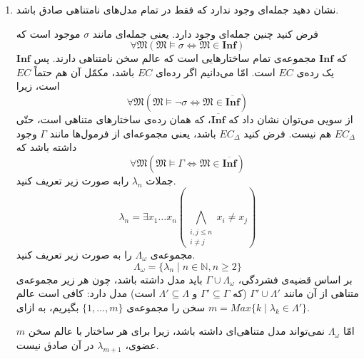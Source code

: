 \documentclass[12pt, 14paper]{article}
\begin{document}
\begin{enumerate}
\item نشان دهید جمله‌ای وجود ندارد که فقط در تمام مدل‌های نامتناهی صادق باشد.
\begin{ans}
  فرض کنید چنین جمله‌ای وجود دارد. یعنی جمله‌ای مانند $\sigma$ موجود است که
  $$ \forall \mathfrak{M} (\mathfrak{M} \vDash \sigma \iff \mathfrak{M} \in \mathbf{Inf}) $$
  که $\mathbf{Inf}$ مجموعه‌ی تمام ساختارهایی است که عالم سخن نامتناهی دارند. پس $\mathbf{Inf}$ یک رده‌ی $EC$ است. امّا می‌دانیم اگر رده‌ای $EC$ باشد، مکمّل آن هم حتماً $EC$ است، زیرا
  $$ \forall \mathfrak{M} (\mathfrak{M} \vDash \neg \sigma \iff \mathfrak{M} \in \overline{\mathbf{Inf}}) $$
  از سویی می‌توان نشان داد که $\overline{\mathbf{Inf}}$، که همان رده‌ی ساختارهای متناهی است، حتّی $EC_\Delta$ هم نیست. فرض کنید $EC_\Delta$ باشد، یعنی مجموعه‌ای از فرمول‌ها مانند $\Gamma$ وجود داشته باشد که
  $$ \forall \mathfrak{M} (\mathfrak{M} \vDash \Gamma \iff \mathfrak{M} \in \overline{\mathbf{Inf}}) $$
  جملات $\lambda_n$ رابه صورت زیر تعریف کنید.
  $$ \lambda_n = \exists x_1 \dots x_n (\bigwedge_{\substack{i,j \leq n \\ i \neq j}} x_i \neq x_j)  $$
  مجموعه‌ی $\Lambda_\omega$ را به صورت زیر تعریف کنید.
  $$ \Lambda_\omega = \{ \lambda_n \mid n \in \mathbb{N}, n \geq 2 \} $$
  بر اساس قضیه‌ی فشردگی، $\Gamma \cup \Lambda_\omega$ باید مدل داشته باشد، چون هر زیر مجموعه‌ی متناهی از آن مانند $\Gamma' \cup \Lambda'$ (که $\Gamma' \subseteq \Gamma$ و $\Lambda' \subseteq \Lambda$ است) مدل دارد: کافی است عالم سخن را مجموعه‌ی $\{ 1, \dots, m \}$ بگیریم، به ازای $m = Max\{k \mid \lambda_k \in \Lambda'\}$.

  امّا $\Lambda_\omega$ نمی‌تواند مدل متناهی‌ای داشته باشد، زیرا برای هر ساختار با عالم سخن $m$ عضوی، $\lambda_{m+1}$ در آن صادق نیست.
\end{ans}

\end{enumerate}
\end{document}
